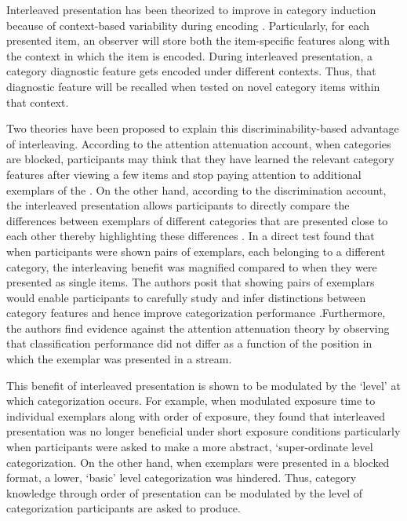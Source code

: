 Interleaved presentation has been theorized to improve in category induction because of context-based variability during encoding \cite{glenberg1979component}. Particularly, for each presented item, an observer will store both the item-specific features along with the context in which the item is encoded. During interleaved presentation, a category diagnostic feature gets encoded under different contexts. Thus, that diagnostic feature will be recalled when tested on novel category items within that context. 

Two theories have been proposed to explain this discriminability-based advantage of interleaving. According to the attention attenuation account, when categories are blocked, participants may think that they have learned the relevant category features after viewing a few items and stop paying attention to additional exemplars of the \cite{kornell2010spacing}. On the other hand, according to the discrimination account, the interleaved presentation allows participants to directly compare the differences between exemplars of different categories that are presented close to each other thereby highlighting these differences \cite{kornell2008learning}. In a direct test \cite{wahlheim2011spacing} found that when participants were shown pairs of exemplars, each belonging to a different category, the interleaving benefit was magnified compared to when they were presented as single items. The authors posit that showing pairs of exemplars would enable participants to carefully study and infer distinctions between category features and hence improve categorization performance .Furthermore, the authors find evidence against the attention attenuation theory by observing that classification performance did not differ as a function of the position in which the exemplar was presented in a stream.

This benefit of interleaved presentation is shown to be modulated by the `level' at which categorization occurs. For example, when \cite{mack2015dynamics} modulated exposure time to individual exemplars along with order of exposure, they found that interleaved presentation was no longer beneficial under short exposure conditions particularly when participants were asked to make a more abstract, `super-ordinate level categorization. On the other hand, when exemplars were presented in a blocked format, a lower, `basic' level categorization was hindered. Thus, category knowledge through order of presentation can be modulated by the level of categorization participants are asked to produce.

